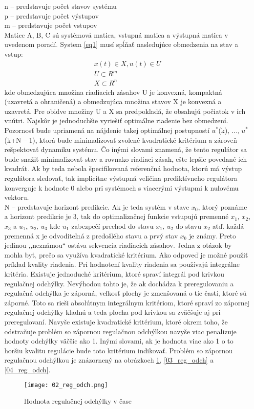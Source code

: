 n – predstavuje počet stavov systému \\
p – predstavuje počet výstupov \\
m – predstavuje počet vstupov \\
Matice A, B, C sú systémová matica, vstupná matica a výstupná matica v uvedenom poradí. System \ref{eq1} musí spĺňať nasledujúce obmedzenia na stav a vstup:
\begin{equation} \label{eq2}
\begin{split}
x(t)∈X,u(t)∈U \\
U⊂R^m \\
X⊂R^n
\end{split}
\end{equation}
kde obmedzujúca množina riadiacich zásahov U je konvexná, kompaktná (uzavretá a ohraničená) a obmedzujúca množina stavov X je konvexná a uzavretá. Pre obidve množiny U a X sa predpokladá, že obsahujú počiatok v ich vnútri.\cite{MPC04}
Najskôr je jednoduchšie vyriešiť optimálne riadenie bez obmedzení. Pozornosť bude upriamená na nájdenie takej optimálnej postupností $u^*$(k), ..., $u^*$(k+N – 1), ktorá bude minimalizovať zvolené kvadratické kritérium a zároveň rešpektovať dynamiku systému. Čo inými slovami znamená, že tento regulátor sa bude snažiť minimalizovať stav a rovnako riadiaci zásah, ešte lepšie povedané ich kvadrát. Ak by teda nebola špecifikovaná referenčná hodnota, ktorú má výstup regulátora sledovať, tak implicitne výstupná veličina prediktívneho regulátora konverguje k hodnote 0 alebo pri systémoch s viacerými výstupmi k nulovému vektoru.\\
N – predstavuje horizont predikcie. Ak je teda systém v stave $x_0$, ktorý poznáme a horizont predikcie je 3, tak do optimalizačnej funkcie vstupujú premenné $x_1$, $x_2$, $x_3$ a $u_1$, $u_2$, $u_3$ kde $u_1$ zabezpečí prechod do stavu $x_1$, $u_2$ do stavu $x_2$ atď. každá premenná x je odvoditeľná z predošlého stavu a prvý stav $x_0$ je známy. Preto jedinou ,,neznámou`` ostáva sekvencia riadiacich zásahov. Jedna z otázok by mohla byť, prečo sa využíva kvadratické kritérium. Ako odpoveď je možné použiť príklad kvality riadenia. Pri hodnotení kvality riadenia sa používajú integrálne kritéria. Existuje jednoduché kritérium, ktoré spraví integrál pod krivkou regulačnej odchýlky. Nevýhodou tohto je, že ak dochádza k preregulovaniu a regulačná odchýlka je záporná, veľkosť plochy je zmenšovaná o tie časti, ktoré sú záporné. Toto sa rieši absolútnym integrálnym kritériom, ktoré spraví zo zápornej regulačnej odchýlky kladnú a teda plocha pod krivkou sa zväčšuje aj pri preregulovaní. Navyše existuje kvadratické kritérium, ktoré okrem toho, že odstraňuje problém so zápornou regulačnou odchýlkou navyše viac penalizuje hodnoty odchýlky väčšie ako 1. Inými slovami, ak je hodnota viac ako 1 o to horšiu kvalitu regulácie bude toto kritérium indikovať. Problém so zápornou regulačnou odchýlkou je znázornený na obrázkoch \ref{02_reg_odch}, \ref{03_reg_odch} a \ref{04_reg_odch}.
\begin{figure}[!htbp]
\centering
\texttt{[image: 02\_reg\_odch.png]}
\caption{Hodnota regulačnej odchýlky v čase}
\label{02_reg_odch}
\end{figure}

